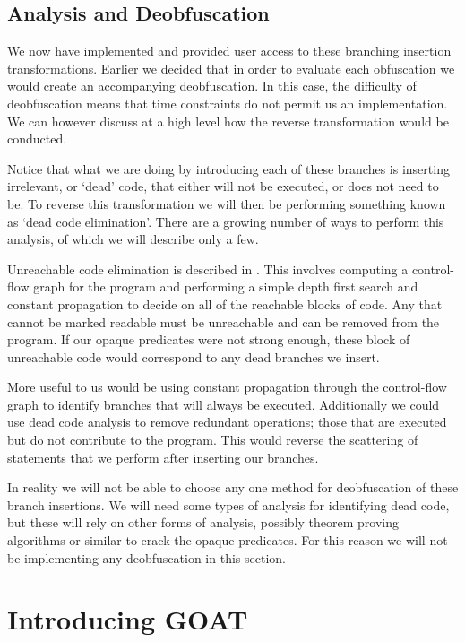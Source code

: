 \documentclass[twoside,a4paper]{report}
\begin{document}
\subsection{Analysis and Deobfuscation}

We now have implemented and provided user access to these branching insertion transformations. Earlier we decided that in order to evaluate each obfuscation
we would create an accompanying deobfuscation. In this case, the difficulty of deobfuscation means that time constraints do not permit us an implementation.
We can however discuss at a high level how the reverse transformation would be conducted.

Notice that what we are doing by introducing each of these branches is inserting irrelevant, or `dead' code, that either will not be executed, or does not
need to be. To reverse this transformation we will then be performing something known as `dead code elimination'. There are a growing number of ways to perform
this analysis, of which we will describe only a few.

Unreachable code elimination is described in \cite{codecompact}. This involves computing a control-flow graph for the program and performing a simple depth
first search and constant propagation to decide on all of the reachable blocks of code. Any that cannot be marked readable must be unreachable and can be removed
from the program. If our opaque predicates were not strong enough, these block of unreachable code would correspond to any dead branches we insert.

More useful to us would be using constant propagation through the control-flow graph to identify branches that will always be executed. Additionally we could use
dead code analysis to remove redundant operations; those that are executed but do not contribute to the program. This would reverse the scattering of statements
that we perform after inserting our branches.

In reality we will not be able to choose any one method for deobfuscation of these branch insertions. We will need some types of analysis for identifying dead
code, but these will rely on other forms of analysis, possibly theorem proving algorithms or similar to crack the opaque predicates. For this reason we will not
be implementing any deobfuscation in this section.

\section{Introducing GOAT}
\end{document}
